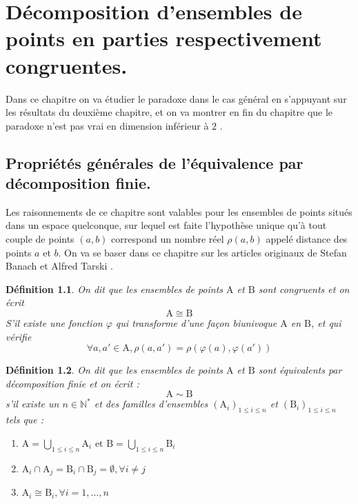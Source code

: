 \chapter{Décomposition d'ensembles de points en parties respectivement congruentes.}
Dans ce chapitre on va étudier le paradoxe dans le cas général en s'appuyant sur les résultats du deuxième chapitre, et on
va montrer en fin du chapitre que le paradoxe n'est pas vrai en dimension inférieur à $2$ .
\section{Propriétés générales de l'équivalence par décomposition finie.}\label{3.}
\setcounter{lemma}{0}
\newtheorem{deff}{Définition}
\newtheorem{T}{Théorème}
\newtheorem{Co}{Corollaire}
\newtheorem{PR}{Proposition}
Les raisonnements de ce chapitre sont valables pour les ensembles de points situés dans un espace quelconque, sur lequel est faite l'hypothèse unique qu'à tout couple de points $(a,b)$ correspond un nombre réel $\mathcal{\rho}(a,b)$ appelé distance des points $a$ et $b$. On va se baser dans ce chapitre sur les articles originaux de Stefan Banach et Alfred Tarski \cite{cite0}.
\begin{deff}\label{def3.1}
  On dit que les ensembles de points $\mathrm{A}$ et $\mathrm{B}$ sont congruents et on écrit $$\mathrm{A} \cong \mathrm{B}$$
  S'il existe une fonction $\varphi$ qui transforme d'une façon biunivoque $\mathrm{A}$ en $\mathrm{B}$, et qui vérifie  $$\forall a,a' \in \mathrm{A}, \mathcal{\rho}(a, a') =  \mathcal{\rho}\left(\varphi\left(a\right), \varphi\left(a'\right)\right)$$
\end{deff}

\begin{deff}\label{def3.2}
  On dit que les ensembles de points $\mathrm{A}$ et $\mathrm{B}$ sont équivalents par décomposition finie et on écrit :$$\mathrm{A} \sim \mathrm{B}$$ s'il existe un $n \in \mathbb{N}^*$ et des familles d'ensembles $\left(\mathrm{A}_i\right)_{1\le i \le n}$ et $\left(\mathrm{B}_i\right)_{1\le i \le n}$ tels que :
  \begin{center}
  \begin{enumerate}
    \item $\mathrm{A} = \underset{1\le i \le n}{\bigcup}\mathrm{A}_i \text{ et } \mathrm{B} = \underset{1\le i \le n}{\bigcup}\mathrm{B}_i$
    \item $\mathrm{A}_i \cap \mathrm{A}_j = \mathrm{B}_i \cap \mathrm{B}_j = \emptyset, \forall i\neq j$
    \item $\mathrm{A}_i \cong \mathrm{B}_i, \forall i=1, ...,n$
  \end{enumerate}
\end{center}
\end{deff}

